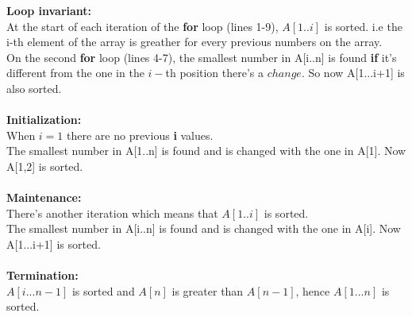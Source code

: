 \documentclass[12pt, twoside, a4paper]{article}
\begin{document}
  \textbf{Loop invariant:}\\ At the start of each iteration of the \textbf{for} loop (lines 1-9), $A[1..i]$ is sorted. i.e the i-th element of the array is
  greather for every previous numbers on the array.\\
  On the second \textbf{for} loop (lines 4-7), the smallest number in A[i..n] is found \textbf{if} it's different from the one in the $i-$th position there's
  a $change$. So now A[1...i+1] is also sorted.\\ \\
  \textbf{Initialization:} \\ 
  When $i = 1$ there are no previous \textbf{i} values.\\
  The smallest number in A[1..n] is found and is changed with the one in
   A[1]. Now A[1,2] is sorted. \\ \\
  \textbf{Maintenance:} \\
  There's another iteration which means that $A[1..i]$ is sorted. \\
  The smallest number in A[i..n] is found and is changed with the one in
  A[i]. Now A[1...i+1] is sorted. \\ \\
  \textbf{Termination:}\\
  $A[i...n-1]$ is sorted and $A[n]$ is greater than $A[n-1]$,
  hence $A[1...n]$ is sorted.\\
  
\end{document}
